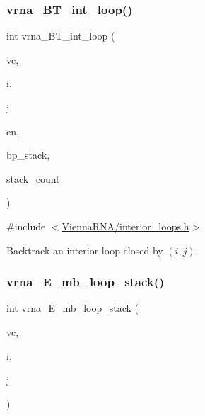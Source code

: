 \subsubsection{\texorpdfstring{vrna\+\_\+\+B\+T\+\_\+int\+\_\+loop()}{vrna\_BT\_int\_loop()}}
{\footnotesize\ttfamily int vrna\+\_\+\+B\+T\+\_\+int\+\_\+loop (\begin{DoxyParamCaption}\item[{\mbox{\hyperlink{group__fold__compound_ga1b0cef17fd40466cef5968eaeeff6166}{vrna\+\_\+fold\+\_\+compound\+\_\+t}} $\ast$}]{vc,  }\item[{int $\ast$}]{i,  }\item[{int $\ast$}]{j,  }\item[{int}]{en,  }\item[{\mbox{\hyperlink{group__data__structures_gaa651bda42e7692f08cb603cd6834b0ee}{vrna\+\_\+bp\+\_\+stack\+\_\+t}} $\ast$}]{bp\+\_\+stack,  }\item[{int $\ast$}]{stack\+\_\+count }\end{DoxyParamCaption})}



{\ttfamily \#include $<$\mbox{\hyperlink{interior__loops_8h}{Vienna\+R\+N\+A/interior\+\_\+loops.\+h}}$>$}



Backtrack an interior loop closed by $ (i,j) $. 

\mbox{\label{group__loops_ga73f048d35475e1d8f50b7d4ac6a2aeb6}} 
\subsubsection{\texorpdfstring{vrna\+\_\+\+E\+\_\+mb\+\_\+loop\+\_\+stack()}{vrna\_E\_mb\_loop\_stack()}}
{\footnotesize\ttfamily int vrna\+\_\+\+E\+\_\+mb\+\_\+loop\+\_\+stack (\begin{DoxyParamCaption}\item[{\mbox{\hyperlink{group__fold__compound_ga1b0cef17fd40466cef5968eaeeff6166}{vrna\+\_\+fold\+\_\+compound\+\_\+t}} $\ast$}]{vc,  }\item[{int}]{i,  }\item[{int}]{j }\end{DoxyParamCaption})}



